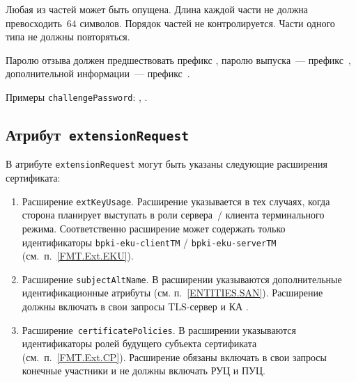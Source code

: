 Любая из частей может быть опущена. Длина каждой части не должна 
превосходить~$64$ символов. Порядок частей не контролируется.
Части одного типа не должны повторяться.

Паролю отзыва должен предшествовать префикс 
, паролю выпуска~--- префикс~,
дополнительной информации~--- префикс~.

Примеры \texttt{challengePassword}:
, .

\subsection{Атрибут~\texttt{extensionRequest}}\label{FMT.CSR.ER}

В атрибуте \texttt{extensionRequest} могут быть указаны следующие 
расширения сертификата:

\begin{enumerate}
\item 
Расширение \texttt{extKeyUsage}. Расширение указывается в тех случаях, 
когда сторона планирует выступать в роли сервера~/ клиента терминального 
режима. Соответственно расширение может содержать только идентификаторы  
\verb|bpki-eku-clientTM| / \verb|bpki-eku-serverTM| 
(см.~п.~\ref{FMT.Ext.EKU}). 



\item 
Расширение \texttt{subjectAltName}. В расширении указываются 
дополнительные идентификационные атрибуты (см. п.~\ref{ENTITIES.SAN}). 
Расширение должны включать в свои запросы TLS-сервер и КА 
.


\item
Расширение~\texttt{certificatePolicies}. В расширении
указываются идентификаторы ролей будущего субъекта сертификата
(см.~п.~\ref{FMT.Ext.CP}).
Расширение обязаны включать в свои запросы конечные участники 
и не должны включать РУЦ и ПУЦ.
\end{enumerate}
